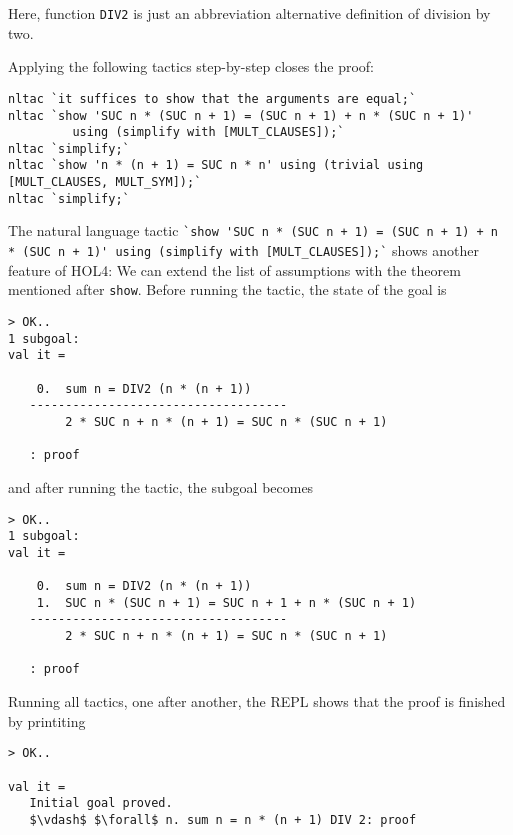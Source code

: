 Here, function \lstinline{DIV2} is just an abbreviation alternative definition
of division by two.

Applying the following tactics step-by-step closes the proof:

\begin{lstlisting}
nltac `it suffices to show that the arguments are equal;`
nltac `show 'SUC n * (SUC n + 1) = (SUC n + 1) + n * (SUC n + 1)'
         using (simplify with [MULT_CLAUSES]);`
nltac `simplify;`
nltac `show 'n * (n + 1) = SUC n * n' using (trivial using [MULT_CLAUSES, MULT_SYM]);`
nltac `simplify;`
\end{lstlisting}

\begin{sloppypar}
The natural language tactic \lstinline{`show 'SUC n * (SUC n + 1) = (SUC n + 1) + n * (SUC n + 1)' using (simplify with [MULT_CLAUSES]);`}
shows another feature of HOL4:
We can extend the list of assumptions with the theorem mentioned after
\lstinline{show}.
Before running the tactic, the state of the goal is
\end{sloppypar}
\begin{lstlisting}
> OK..
1 subgoal:
val it =

    0.  sum n = DIV2 (n * (n + 1))
   ------------------------------------
        2 * SUC n + n * (n + 1) = SUC n * (SUC n + 1)

   : proof
\end{lstlisting}

and after running the tactic, the subgoal becomes
\begin{lstlisting}
> OK..
1 subgoal:
val it =

    0.  sum n = DIV2 (n * (n + 1))
    1.  SUC n * (SUC n + 1) = SUC n + 1 + n * (SUC n + 1)
   ------------------------------------
        2 * SUC n + n * (n + 1) = SUC n * (SUC n + 1)

   : proof
\end{lstlisting}

Running all tactics, one after another, the REPL shows that the proof is finished by printiting
\begin{lstlisting}
> OK..

val it =
   Initial goal proved.
   $\vdash$ $\forall$ n. sum n = n * (n + 1) DIV 2: proof
\end{lstlisting}

